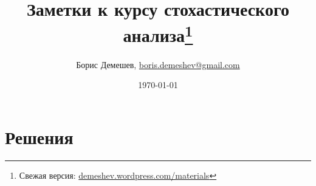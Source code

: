 \documentclass[pdftex,12pt,a4paper]{article}
\title{Заметки к курсу стохастического анализа\footnote{Свежая версия: \url{demeshev.wordpress.com/materials}}}
\author{Борис Демешев, \href{mailto:boris.demeshev@gmail.com}{boris.demeshev@gmail.com} }
\date{\today}
\numberwithin{equation}{page} %
\theoremstyle{definition} %
\theoremstyle{definition}
\theoremstyle{definition}
\begin{document}

\maketitle
\tableofcontents{}






\problemonly


\restoresection
\section{Решения}
\solutiononly

\restoresection

%
%

\printbibliography

\printindex %
\end{document}
